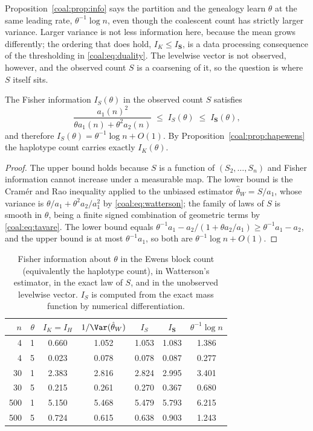 Proposition~\ref{coal:prop:info} says the partition and the genealogy learn $\theta$ at the same leading rate, $\theta^{-1}\log n$, even though the coalescent count has strictly larger variance. Larger variance is not less information here, because the mean grows differently; the ordering that does hold, $I_K\le I_{\bm S}$, is a data processing consequence of the thresholding in \eqref{coal:eq:duality}. The levelwise vector is not observed, however, and the observed count $S$ is a coarsening of it, so the question is where $S$ itself sits.

\begin{corollary}[Information in $S$]\label{coal:cor:infoS}
The Fisher information $I_S(\theta)$ in the observed count $S$ satisfies
\[
\frac{a_1(n)^2}{\theta a_1(n)+\theta^2a_2(n)}\;\le\;I_S(\theta)\;\le\;I_{\bm S}(\theta),
\]
and therefore $I_S(\theta)=\theta^{-1}\log n+O(1)$. By Proposition~\ref{coal:prop:hapewens} the haplotype count carries exactly $I_K(\theta)$.
\end{corollary}

\begin{proof}
The upper bound holds because $S$ is a function of $(S_2,\dots,S_n)$ and Fisher information cannot increase under a measurable map. The lower bound is the Cram\'er and Rao inequality applied to the unbiased estimator $\hat\theta_W=S/a_1$, whose variance is $\theta/a_1+\theta^2a_2/a_1^2$ by \eqref{coal:eq:watterson}; the family of laws of $S$ is smooth in $\theta$, being a finite signed combination of geometric terms by \eqref{coal:eq:tavare}. The lower bound equals $\theta^{-1}a_1-a_2/(1+\theta a_2/a_1)\ge\theta^{-1}a_1-a_2$, and the upper bound is at most $\theta^{-1}a_1$, so both are $\theta^{-1}\log n+O(1)$.
\end{proof}

\begin{table}[t]
\centering
\small
\begin{tabular}{rrccccc}
\toprule
$n$ & $\theta$ & $I_K=I_H$ & $1/\Var(\hat\theta_W)$ & $I_S$ & $I_{\bm S}$ & $\theta^{-1}\log n$\\
\midrule
4 & 1 & 0.660 & 1.052 & 1.053 & 1.083 & 1.386\\
4 & 5 & 0.023 & 0.078 & 0.078 & 0.087 & 0.277\\
30 & 1 & 2.383 & 2.816 & 2.824 & 2.995 & 3.401\\
30 & 5 & 0.215 & 0.261 & 0.270 & 0.367 & 0.680\\
500 & 1 & 5.150 & 5.468 & 5.479 & 5.793 & 6.215\\
500 & 5 & 0.724 & 0.615 & 0.638 & 0.903 & 1.243\\
\bottomrule
\end{tabular}
\caption{Fisher information about $\theta$ in the Ewens block count (equivalently the haplotype count), in Watterson's estimator, in the exact law of $S$, and in the unobserved levelwise vector. $I_S$ is computed from the exact mass function by numerical differentiation.}
\label{coal:tab:info}
\end{table}

